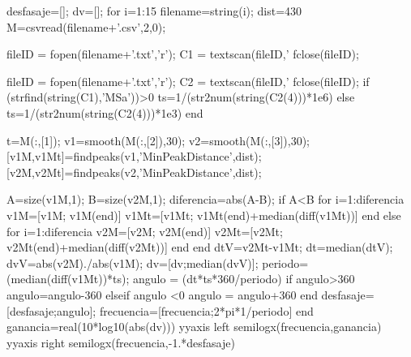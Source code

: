  desfasaje=[];
 dv=[];
 for i=1:15
 filename=string(i);
 dist=430
 M=csvread(filename+'.csv',2,0);
 
 fileID = fopen(filename+'.txt','r');
 C1 = textscan(fileID,'%
 fclose(fileID);
 
 fileID = fopen(filename+'.txt','r');
 C2 = textscan(fileID,'%
 fclose(fileID);
 if (strfind(string(C1),'MSa'))>0
 ts=1/(str2num(string(C2(4)))*1e6)
 else
 ts=1/(str2num(string(C2(4)))*1e3)
 end
 
 t=M(:,[1]);
 v1=smooth(M(:,[2]),30);
 v2=smooth(M(:,[3]),30);
 [v1M,v1Mt]=findpeaks(v1,'MinPeakDistance',dist);
 [v2M,v2Mt]=findpeaks(v2,'MinPeakDistance',dist);
 
 A=size(v1M,1);
 B=size(v2M,1);
 diferencia=abs(A-B);
 if A<B
 for i=1:diferencia
 v1M=[v1M; v1M(end)]
 v1Mt=[v1Mt; v1Mt(end)+median(diff(v1Mt))]
 end
 else
 for i=1:diferencia
 v2M=[v2M; v2M(end)]
 v2Mt=[v2Mt; v2Mt(end)+median(diff(v2Mt))]
 end
 end
 dtV=v2Mt-v1Mt;
 dt=median(dtV);
 dvV=abs(v2M)./abs(v1M);
 dv=[dv;median(dvV)];
 periodo=(median(diff(v1Mt))*ts);
 angulo = (dt*ts*360/periodo)
 if angulo>360
 angulo=angulo-360
 elseif angulo <0
 angulo = angulo+360
 end
 desfasaje=[desfasaje;angulo];
 frecuencia=[frecuencia;2*pi*1/periodo]
 end
 ganancia=real(10*log10(abs(dv)))
 yyaxis left
 semilogx(frecuencia,ganancia)
 yyaxis right
 semilogx(frecuencia,-1.*desfasaje)
 
